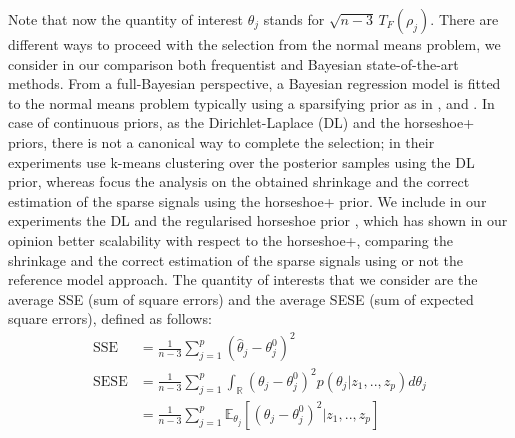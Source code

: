 \documentclass[american,]{article}
\theoremstyle{definition}
\begin{document}
Note that now the quantity of interest $\theta_{j}$ stands for $\sqrt{n-3}\,T_{F}(\rho_{j})$. There are different ways to proceed with the selection from the normal means problem, we consider in our comparison both frequentist and Bayesian state-of-the-art methods. From a full-Bayesian perspective, a Bayesian regression model is fitted to the normal means problem typically using a sparsifying prior as in \cite{paper:dirichlet_laplace}, \cite{paper:horseshoe+} and \cite{paper:EBmed}. In case of continuous priors, as the Dirichlet-Laplace (DL) and the horseshoe+ priors, there is not a canonical way to complete the selection; in their experiments \cite{paper:dirichlet_laplace} use k-means clustering over the posterior samples using the DL prior, whereas \cite{paper:horseshoe+} focus the analysis on the obtained shrinkage and the correct estimation of the sparse signals using the horseshoe+ prior. We include in our experiments the DL and the regularised horseshoe prior \citep{paper:rhs}, which has shown in our opinion better scalability with respect to the horseshoe+, comparing the shrinkage and the correct estimation of the sparse signals using or not the reference model approach. The quantity of interests that we consider are the average SSE (sum of square errors) and the average SESE (sum of expected square errors), defined as follows:
\
\begin{align}
\text{SSE}&=\frac{1}{n-3}\sum_{j=1}^{p}(\hat{\theta}_{j} - \theta^{0}_{j})^{2} \label{eq:SSE} \\
\text{SESE}&=\frac{1}{n-3}\sum_{j=1}^{p}\int_{\mathbb{R}}(\theta_{j}-\theta^{0}_{j})^{2}p(\theta_{j}|z_{1},..,z_{p})d\theta_{j} \\
&=\frac{1}{n-3}\sum_{j=1}^{p}\mathbb{E}_{\theta_{j}}[(\theta_{j}-\theta^{0}_{j})^{2}|z_{1},..,z_{p}] \label{eq:SESE}
\end{align}
\end{document}
